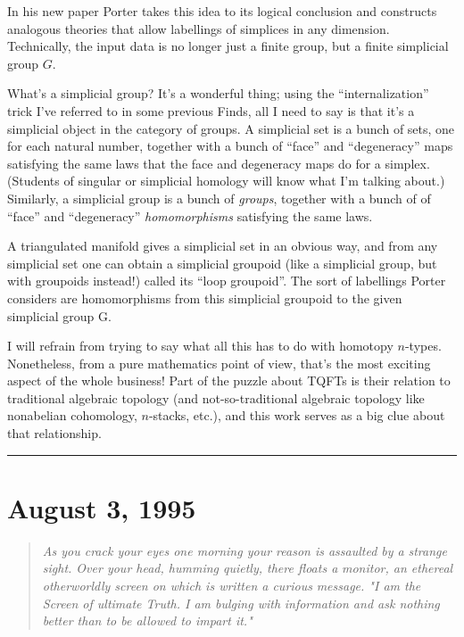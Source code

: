 \documentclass{article}
\begin{document}
In his new paper Porter takes this idea to its logical conclusion and
constructs analogous theories that allow labellings of simplices in any
dimension. Technically, the input data is no longer just a finite group,
but a finite simplicial group \(G\).

What's a simplicial group? It's a wonderful thing; using the
``internalization'' trick I've referred to in some previous Finds, all I
need to say is that it's a simplicial object in the category of groups.
A simplicial set is a bunch of sets, one for each natural number,
together with a bunch of ``face'' and ``degeneracy'' maps satisfying the
same laws that the face and degeneracy maps do for a simplex. (Students
of singular or simplicial homology will know what I'm talking about.)
Similarly, a simplicial group is a bunch of \emph{groups}, together with
a bunch of of ``face'' and ``degeneracy'' \emph{homomorphisms}
satisfying the same laws.

A triangulated manifold gives a simplicial set in an obvious way, and
from any simplicial set one can obtain a simplicial groupoid (like a
simplicial group, but with groupoids instead!) called its ``loop
groupoid''. The sort of labellings Porter considers are homomorphisms
from this simplicial groupoid to the given simplicial group G.

I will refrain from trying to say what all this has to do with homotopy
\(n\)-types. Nonetheless, from a pure mathematics point of view, that's
the most exciting aspect of the whole business! Part of the puzzle about
TQFTs is their relation to traditional algebraic topology (and
not-so-traditional algebraic topology like nonabelian cohomology,
\(n\)-stacks, etc.), and this work serves as a big clue about that
relationship.

\begin{center}\rule{0.5\linewidth}{0.5pt}\end{center}
\hypertarget{week59}{%
\section{August 3, 1995}\label{week59}}

\begin{quote}
\emph{As you crack your eyes one morning your reason is assaulted by a}
\emph{strange sight. Over your head, humming quietly, there floats a}
\emph{monitor, an ethereal otherworldly screen on which is written a
curious} \emph{message. "I am the Screen of ultimate Truth. I am bulging
with} \emph{information and ask nothing better than to be allowed to
impart it."}
\end{quote}
\end{document}
